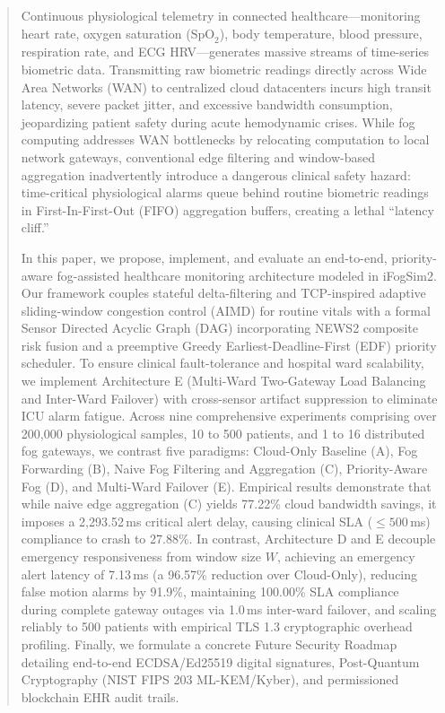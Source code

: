 \documentclass[conference]{IEEEtran}
\begin{document}
\begin{abstract}
Continuous physiological telemetry in connected healthcare---monitoring heart rate, oxygen saturation ($\text{SpO}_2$), body temperature, blood pressure, respiration rate, and ECG HRV---generates massive streams of time-series biometric data. Transmitting raw biometric readings directly across Wide Area Networks (WAN) to centralized cloud datacenters incurs high transit latency, severe packet jitter, and excessive bandwidth consumption, jeopardizing patient safety during acute hemodynamic crises. While fog computing addresses WAN bottlenecks by relocating computation to local network gateways, conventional edge filtering and window-based aggregation inadvertently introduce a dangerous clinical safety hazard: time-critical physiological alarms queue behind routine biometric readings in First-In-First-Out (FIFO) aggregation buffers, creating a lethal ``latency cliff.''

In this paper, we propose, implement, and evaluate an end-to-end, priority-aware fog-assisted healthcare monitoring architecture modeled in iFogSim2. Our framework couples stateful delta-filtering and TCP-inspired adaptive sliding-window congestion control (AIMD) for routine vitals with a formal Sensor Directed Acyclic Graph (DAG) incorporating NEWS2 composite risk fusion and a preemptive Greedy Earliest-Deadline-First (EDF) priority scheduler. To ensure clinical fault-tolerance and hospital ward scalability, we implement Architecture E (Multi-Ward Two-Gateway Load Balancing and Inter-Ward Failover) with cross-sensor artifact suppression to eliminate ICU alarm fatigue. Across nine comprehensive experiments comprising over 200,000 physiological samples, 10 to 500 patients, and 1 to 16 distributed fog gateways, we contrast five paradigms: Cloud-Only Baseline (A), Fog Forwarding (B), Naive Fog Filtering and Aggregation (C), Priority-Aware Fog (D), and Multi-Ward Failover (E). Empirical results demonstrate that while naive edge aggregation (C) yields 77.22\% cloud bandwidth savings, it imposes a 2,293.52\,ms critical alert delay, causing clinical SLA ($\le 500$\,ms) compliance to crash to 27.88\%. In contrast, Architecture D and E decouple emergency responsiveness from window size $W$, achieving an emergency alert latency of 7.13\,ms (a 96.57\% reduction over Cloud-Only), reducing false motion alarms by 91.9\%, maintaining 100.00\% SLA compliance during complete gateway outages via 1.0\,ms inter-ward failover, and scaling reliably to 500 patients with empirical TLS 1.3 cryptographic overhead profiling. Finally, we formulate a concrete Future Security Roadmap detailing end-to-end ECDSA/Ed25519 digital signatures, Post-Quantum Cryptography (NIST FIPS 203 ML-KEM/Kyber), and permissioned blockchain EHR audit trails.
\end{abstract}
\end{document}
